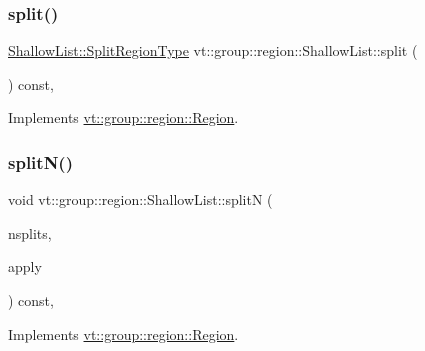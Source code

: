 \subsubsection{\texorpdfstring{split()}{split()}}
{\footnotesize\ttfamily \hyperlink{structvt_1_1group_1_1region_1_1_region_ab8d05c0978c7f38292a9ed5a15498a4b}{Shallow\+List\+::\+Split\+Region\+Type} vt\+::group\+::region\+::\+Shallow\+List\+::split (\begin{DoxyParamCaption}{ }\end{DoxyParamCaption}) const\hspace{0.3cm}{\ttfamily [override]}, {\ttfamily [virtual]}}



Implements \hyperlink{structvt_1_1group_1_1region_1_1_region_a2cbbbff6358f0f63235d95501858f512}{vt\+::group\+::region\+::\+Region}.

\mbox{\label{structvt_1_1group_1_1region_1_1_shallow_list_ac41946e0f130b3d4b42f9edbe20f3605}} 
\subsubsection{\texorpdfstring{split\+N()}{splitN()}}
{\footnotesize\ttfamily void vt\+::group\+::region\+::\+Shallow\+List\+::splitN (\begin{DoxyParamCaption}\item[{int}]{nsplits,  }\item[{\hyperlink{structvt_1_1group_1_1region_1_1_region_a7c9e99b1157d2fe2f3e6fc36a1463a96}{Apply\+Fn\+Type}}]{apply }\end{DoxyParamCaption}) const\hspace{0.3cm}{\ttfamily [override]}, {\ttfamily [virtual]}}



Implements \hyperlink{structvt_1_1group_1_1region_1_1_region_ae8660d4218b57e91664dedfa807cd936}{vt\+::group\+::region\+::\+Region}.

\mbox{\label{structvt_1_1group_1_1region_1_1_shallow_list_a358a60631cc0d1dd55d72af82e287014}} 

